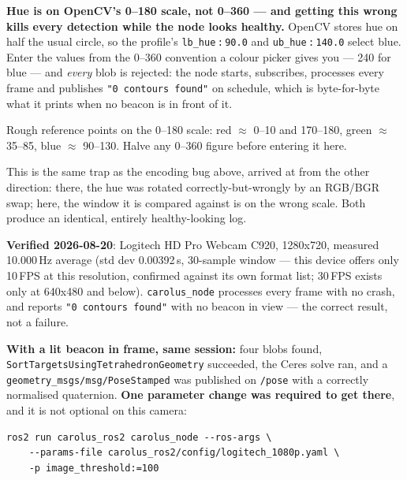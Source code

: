 \documentclass[11pt]{report}
\newenvironment{warningbox}%
  {\begin{lrbox}{\warnbox}\begin{minipage}{0.90\textwidth}}%
  {\end{minipage}\end{lrbox}%
   \begin{center}\fcolorbox{black}{codebg}{\usebox{\warnbox}}\end{center}}
\begin{document}
\begin{warningbox}
\textbf{Hue is on OpenCV's 0--180 scale, not 0--360 --- and getting this
wrong kills every detection while the node looks healthy.} OpenCV stores
hue on half the usual circle, so the profile's
\texttt{lb\_hue}\,\texttt{:}\,\texttt{90.0} and
\texttt{ub\_hue}\,\texttt{:}\,\texttt{140.0} select blue. Enter the values
from the 0--360 convention a colour picker gives you --- 240 for blue --- and
\emph{every} blob is rejected: the node starts, subscribes, processes every
frame and publishes \texttt{"0 contours found"} on schedule, which is
byte-for-byte what it prints when no beacon is in front of it.

Rough reference points on the 0--180 scale: red $\approx$ 0--10 and
170--180, green $\approx$ 35--85, blue $\approx$ 90--130. Halve any
0--360 figure before entering it here.

This is the same trap as the encoding bug above, arrived at from the other
direction: there, the hue was rotated correctly-but-wrongly by an RGB/BGR
swap; here, the window it is compared against is on the wrong scale. Both
produce an identical, entirely healthy-looking log.
\end{warningbox}

\textbf{Verified 2026-08-20}: Logitech HD Pro Webcam C920, 1280x720, measured
10.000\,Hz average (std dev 0.00392\,s, 30-sample window --- this device
offers only 10\,FPS at this resolution, confirmed against its own format
list; 30\,FPS exists only at 640x480 and below). \texttt{carolus\_node}
processes every frame with no crash, and reports \texttt{"0 contours found"}
with no beacon in view --- the correct result, not a failure.

\textbf{With a lit beacon in frame, same session:} four blobs found,
\texttt{SortTargets\allowbreak UsingTetrahedron\allowbreak Geometry}
succeeded, the Ceres solve ran,
and a \texttt{geometry\_msgs/msg/PoseStamped} was published on \texttt{/pose}
with a correctly normalised quaternion. \textbf{One parameter change was
required to get there}, and it is not optional on this camera:

\begin{lstlisting}[style=shell]
ros2 run carolus_ros2 carolus_node --ros-args \
    --params-file carolus_ros2/config/logitech_1080p.yaml \
    -p image_threshold:=100
\end{lstlisting}
\end{document}

